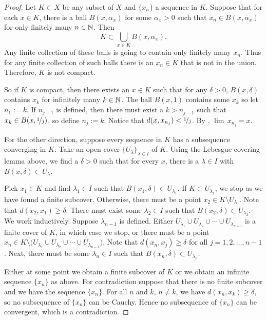 \begin{proof}
Let $K \subset X$ be any subset of $X$ and
$\{ x_n \}$ a sequence in $K$.  Suppose that for each $x \in K$,
there is a ball $B(x,\alpha_x)$ for some $\alpha_x > 0$ such that
$x_n \in B(x,\alpha_x)$ for only finitely many $n \in {\mathbb{N}}$.
Then
\begin{equation*}
K \subset \bigcup_{x \in K} B(x,\alpha_x) .
\end{equation*}
Any finite collection of these balls is going to contain only finitely many
$x_n$.  Thus for any finite collection of such balls there is an $x_n \in K$
that is not in the union.  Therefore, $K$ is not compact.

So if $K$ is compact,
then there exists an $x \in K$ such that
for any $\delta > 0$,
$B(x,\delta)$ contains $x_k$ for infinitely many $k \in {\mathbb{N}}$.
The ball $B(x,1)$ contains some $x_k$ so let $n_1 := k$.
If $n_{j-1}$ is defined, then there must
exist a $k > n_{j-1}$ such that $x_k \in B(x,\nicefrac{1}{j})$, so define
$n_j := k$.  Notice that
$d(x,x_{n_j}) < \nicefrac{1}{j}$.  By ,
$\lim\, x_{n_j} = x$.

For the other direction, suppose every sequence in $K$
has a 
subsequence converging in $K$.
Take
an open cover $\{ U_\lambda \}_{\lambda \in I}$ of $K$.
Using the Lebesgue covering lemma above, we find a $\delta > 0$
such that for every $x$, there is a $\lambda \in I$ with
$B(x,\delta) \subset U_\lambda$.

Pick $x_1 \in K$ and find $\lambda_1 \in I$ such that $B(x_1,\delta) \subset
U_{\lambda_1}$.
If $K \subset U_{\lambda_1}$, we stop as we have found a
finite subcover.
Otherwise, there must be
a point $x_2 \in K \setminus U_{\lambda_1}$.
Note that $d(x_2,x_1) \geq \delta$.
There must exist some $\lambda_2 \in I$ such that
$B(x_2,\delta) \subset U_{\lambda_2}$.
We work inductively.  Suppose $\lambda_{n-1}$ is defined.
Either
$U_{\lambda_1} \cup
U_{\lambda_2} \cup \cdots \cup
U_{\lambda_{n-1}}$ is a finite cover of $K$, in which case we
stop, or
there must be 
a point $x_n \in K \setminus \bigl( U_{\lambda_1} \cup
U_{\lambda_2} \cup \cdots \cup
U_{\lambda_{n-1}}\bigr)$.
Note that $d(x_n,x_j) \geq \delta$ for all $j = 1,2,\ldots,n-1$.
Next, there must be some $\lambda_n \in I$
such that $B(x_n,\delta) \subset U_{\lambda_n}$.

Either at some point we obtain a finite subcover of $K$
or we obtain an
infinite
sequence $\{ x_n \}$ as above.
For contradiction suppose that
there is no finite subcover and we have the sequence $\{ x_n \}$.
For all $n$ and $k$, $n \not= k$, 
we have $d(x_n,x_k) \geq \delta$,
so no subsequence of $\{ x_n \}$ can be
Cauchy.  Hence no subsequence of $\{ x_n \}$ can be convergent,
which is a contradiction.
\end{proof}

